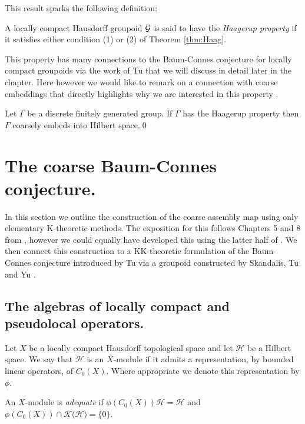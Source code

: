 This result sparks the following definition:

\begin{definition}
A locally compact Hausdorff groupoid $\mathcal{G}$ is said to have the \textit{Haagerup property} if it satisfies either condition (1) or (2) of Theorem \ref{thm:Haag}.
\end{definition}

This property has many connections to the Baum-Connes conjecture for locally compact groupoids via the work of Tu \cite{MR1703305,MR1798599,cbcag2} that we will discuss in detail later in the chapter. Here however we would like to remark on a connection with coarse embeddings that directly highlights why we are interested in this property \cite{MR1852148}.

\begin{proposition}
Let $\Gamma$ be a discrete finitely generated group. If $\Gamma$ has the Haagerup property then $\Gamma$ coarsely embeds into Hilbert space.\qed
\end{proposition}

\section{The coarse Baum-Connes conjecture.}

In this section we outline the construction of the coarse assembly map using only elementary K-theoretic methods. The exposition for this follows Chapters 5 and 8 from \cite{MR1399087}, however we could equally have developed this using the latter half of \cite{MR1817560,MR1388312}. We then connect this construction to a KK-theoretic formulation of the Baum-Connes conjecture introduced by Tu \cite{MR1703305,MR1798599} via a groupoid constructed by Skandalis, Tu and Yu \cite{MR1905840}.

\subsection{The algebras of locally compact and pseudolocal operators.}
Let $X$ be a locally compact Hausdorff topological space and let $\mathcal{H}$ be a Hilbert space. We say that $\mathcal{H}$ is an $X$-module if it admits a representation, by bounded linear operators, of $C_{0}(X)$. Where appropriate we denote this representation by $\phi$.

\begin{definition}
An $X$-module is \textit{adequate} if $\overline{\phi(C_{0}(X))\mathcal{H}}=\mathcal{H}$ and $\phi(C_{0}(X))\cap \mathcal{K(\mathcal{H}})= \lbrace 0 \rbrace$.
\end{definition}

